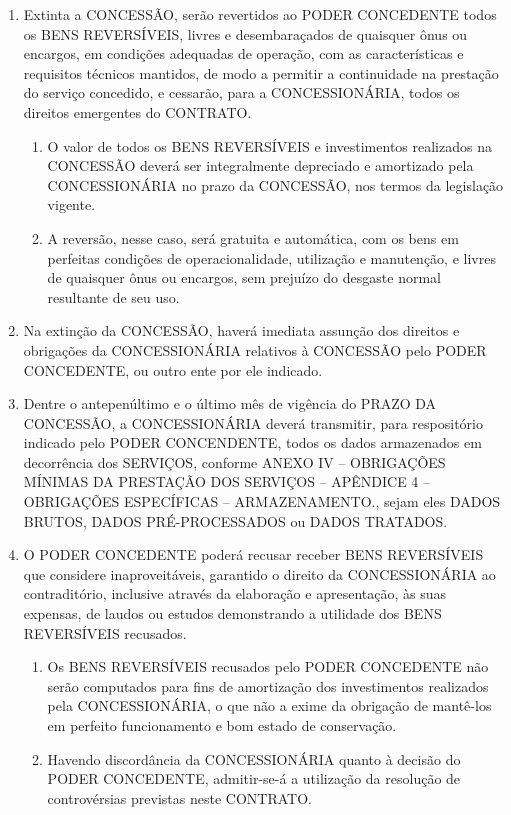 \documentclass[a4paper,11pt]{report} %
\begin{document}
\begin{enumerate}
\item \label{itm:9XEY} Extinta a CONCESSÃO, serão revertidos ao PODER CONCEDENTE todos os BENS REVERSÍVEIS, livres e desembaraçados de quaisquer ônus ou encargos, em condições adequadas de operação, com as características e requisitos técnicos mantidos, de modo a permitir a continuidade na prestação do serviço concedido, e cessarão, para a CONCESSIONÁRIA, todos os direitos emergentes do CONTRATO.

\begin{enumerate}[label*=\arabic*.]
\item \label{itm:TUCS} O valor de todos os BENS REVERSÍVEIS e investimentos realizados na CONCESSÃO deverá ser integralmente depreciado e amortizado pela CONCESSIONÁRIA no prazo da CONCESSÃO, nos termos da legislação vigente.

\item \label{itm:H4VB} A reversão, nesse caso, será gratuita e automática, com os bens em perfeitas condições de operacionalidade, utilização e manutenção, e livres de quaisquer ônus ou encargos, sem prejuízo do desgaste normal resultante de seu uso.
\end{enumerate}

\item \label{itm:TKD8} Na extinção da CONCESSÃO, haverá imediata assunção dos direitos e obrigações da CONCESSIONÁRIA relativos à CONCESSÃO pelo PODER CONCEDENTE, ou outro ente por ele indicado.

\item \label{itm:EH46} Dentre o antepenúltimo e o último mês de vigência do PRAZO DA CONCESSÃO, a CONCESSIONÁRIA deverá transmitir, para respositório indicado pelo PODER CONCENDENTE, todos os dados armazenados em decorrência dos SERVIÇOS, conforme ANEXO IV – OBRIGAÇÕES MÍNIMAS DA PRESTAÇÃO DOS SERVIÇOS – APÊNDICE 4 – OBRIGAÇÕES ESPECÍFICAS – ARMAZENAMENTO., sejam eles DADOS BRUTOS, DADOS PRÉ-PROCESSADOS ou DADOS TRATADOS.

\item \label{itm:PUHE} O PODER CONCEDENTE poderá recusar receber BENS REVERSÍVEIS que considere inaproveitáveis, garantido o direito da CONCESSIONÁRIA ao contraditório, inclusive através da elaboração e apresentação, às suas expensas, de laudos ou estudos demonstrando a utilidade dos BENS REVERSÍVEIS recusados.

\begin{enumerate}[label*=\arabic*.]
\item \label{itm:95F7} Os BENS REVERSÍVEIS recusados pelo PODER CONCEDENTE não serão computados para fins de amortização dos investimentos realizados pela CONCESSIONÁRIA, o que não a exime da obrigação de mantê-los em perfeito funcionamento e bom estado de conservação.

\item \label{itm:XLCM} Havendo discordância da CONCESSIONÁRIA quanto à decisão do PODER CONCEDENTE, admitir-se-á a utilização da resolução de controvérsias previstas neste CONTRATO.
\end{enumerate}
\end{enumerate}
\end{document}
